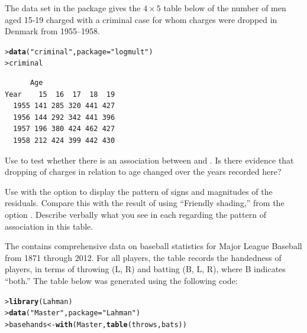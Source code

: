 \documentclass[10pt,krantz2]{krantz}\usepackage[]{graphicx}\usepackage[]{color}
\makeatletter
\newcommand{\hlstr}[1]{\textcolor[rgb]{0.192,0.494,0.8}{#1}}%
\newcommand{\hlstd}[1]{\textcolor[rgb]{0.345,0.345,0.345}{#1}}%
\newcommand{\hlkwb}[1]{\textcolor[rgb]{0.69,0.353,0.396}{#1}}%
\newcommand{\hlkwc}[1]{\textcolor[rgb]{0.333,0.667,0.333}{#1}}%
\newcommand{\hlkwd}[1]{\textcolor[rgb]{0.737,0.353,0.396}{\textbf{#1}}}%
\newenvironment{kframe}{%
 \def\at@end@of@kframe{}%
 \ifinner\ifhmode%
  \def\at@end@of@kframe{\end{minipage}}%
  \begin{minipage}{\columnwidth}%
 \fi\fi%
 \def\FrameCommand##1{\hskip\@totalleftmargin \hskip-\fboxsep
 \colorbox{shadecolor}{##1}\hskip-\fboxsep
     \hskip-\linewidth \hskip-\@totalleftmargin \hskip\columnwidth}%
 \MakeFramed {\advance\hsize-\width
   \@totalleftmargin\z@ \linewidth\hsize
   \@setminipage}}%
 {\par\unskip\endMakeFramed%
 \at@end@of@kframe}
\newenvironment{knitrout}{}{} %
\renewenvironment{knitrout}{\small\renewcommand{\baselinestretch}{.85}}{} %
\makeatother
\begin{document}
\begin{Exercises}

\exercise The data set  in the package  gives the
$4 \times 5$ table below of the
number of men aged 15-19 charged with a criminal case for whom charges were dropped
in Denmark from 1955--1958.
\begin{knitrout}
\color{fgcolor}\begin{kframe}
\begin{alltt}
\hlstd{> }\hlkwd{data}\hlstd{(}\hlstr{"criminal"}\hlstd{,} \hlkwc{package}\hlstd{=}\hlstr{"logmult"}\hlstd{)}
\hlstd{> }\hlstd{criminal}
\end{alltt}
\begin{verbatim}
      Age
Year    15  16  17  18  19
  1955 141 285 320 441 427
  1956 144 292 342 441 396
  1957 196 380 424 462 427
  1958 212 424 399 442 430
\end{verbatim}
\end{kframe}
\end{knitrout}
  \begin{enumerate*}
    \item Use  to test whether there is an association between 
    and .  Is there evidence that dropping of charges in relation to
    age changed over the years recorded here?
    \item Use  with the option  to display the
    pattern of signs and magnitudes of the residuals.  Compare this with the
    result of  using ``Friendly shading,'' from
    the option .  Describe verbally what you see
    in each regarding the pattern of association in this table.
  \end{enumerate*}

\exercise The  contains comprehensive data on baseball statistics for Major League Baseball from 1871 through 2012.  
For all players, the  table records the handedness of players, in terms of
throwing (L, R) and batting (B, L, R), where B indicates ``both.''
The table below was generated using the following code:
\begin{knitrout}
\color{fgcolor}\begin{kframe}
\begin{alltt}
\hlstd{> }\hlkwd{library}\hlstd{(Lahman)}
\hlstd{> }\hlkwd{data}\hlstd{(}\hlstr{"Master"}\hlstd{,} \hlkwc{package}\hlstd{=}\hlstr{"Lahman"}\hlstd{)}
\hlstd{> }\hlstd{basehands} \hlkwb{<-} \hlkwd{with}\hlstd{(Master,} \hlkwd{table}\hlstd{(throws, bats))}
\end{alltt}
\end{kframe}
\end{knitrout}



\end{Exercises}
\end{document}
